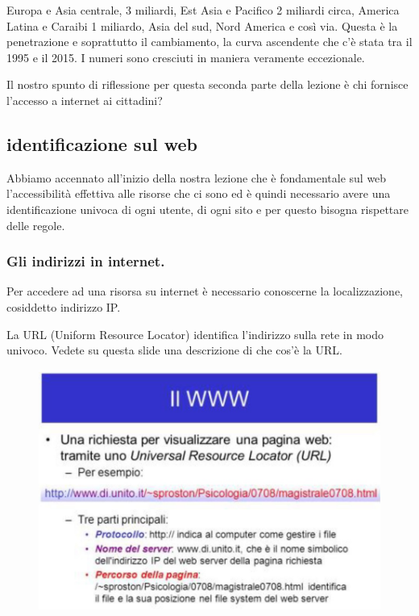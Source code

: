        
       Europa e Asia centrale, 3 miliardi, Est Asia e Pacifico 2 miliardi circa, America Latina e Caraibi 1 miliardo, Asia del sud, Nord America e così via. Questa è la penetrazione e soprattutto il cambiamento, la curva ascendente che c'è stata tra il 1995 e il 2015. I numeri sono cresciuti in maniera veramente eccezionale. \par
       Il nostro spunto di riflessione per questa seconda parte della lezione è chi fornisce l'accesso a internet ai cittadini?\par
       
       \subsection{identificazione sul web}
       
       Abbiamo accennato all'inizio della nostra lezione che è fondamentale sul web l'accessibilità effettiva alle risorse che ci sono ed è quindi necessario avere una identificazione univoca di ogni utente, di ogni sito e  per questo bisogna rispettare delle regole.\par
       
       \subsubsection{Gli indirizzi in internet.}
       
        Per accedere ad una risorsa su internet è necessario conoscerne la localizzazione, cosiddetto indirizzo IP.\par
        La URL (Uniform Resource Locator) identifica l'indirizzo sulla rete in modo univoco.       
        Vedete su questa slide una descrizione di che cos'è la URL. 

        \begin{figure}[h]
            \centering
            \includegraphics[width=0.9\linewidth]{images/03_lez_fig_07.jpg}
        \end{figure}
        
